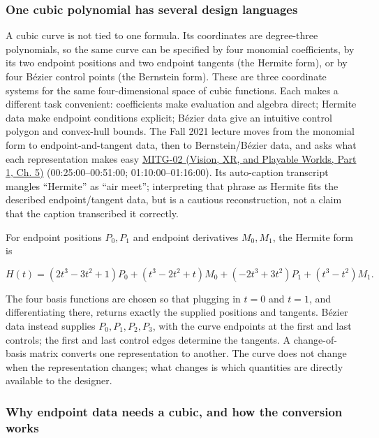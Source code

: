 \subsubsection{One cubic polynomial has several design languages}\label{03-visual-computing-i-ch001-one-cubic-polynomial-has-several-design-languages}

\hypertarget{03-visual-computing-i-ch001-one-cubic-polynomial-has-several-design-languages}{}

A cubic curve is not tied to one formula. Its coordinates are degree-three polynomials, so the same curve can be specified by four monomial coefficients, by its two endpoint positions and two endpoint tangents (the Hermite form), or by four Bézier control points (the Bernstein form). These are three coordinate systems for the same four-dimensional space of cubic functions. Each makes a different task convenient: coefficients make evaluation and algebra direct; Hermite data make endpoint conditions explicit; Bézier data give an intuitive control polygon and convex-hull bounds. The Fall 2021 lecture moves from the monomial form to endpoint-and-tangent data, then to Bernstein/Bézier data, and asks what each representation makes easy \href{../07-Vision-XR-and-Playable-Worlds-P01/main.pdf\#nameddest=04-visual-computing-ii-ch036-mitg-02---cubic-curves}{MITG-02 (Vision, XR, and Playable Worlds, Part 1, Ch. 5)} (00:25:00--00:51:00; 01:10:00--01:16:00). Its auto-caption transcript mangles ``Hermite'' as ``air meet''; interpreting that phrase as Hermite fits the described endpoint/tangent data, but is a cautious reconstruction, not a claim that the caption transcribed it correctly.

For endpoint positions \(P_0,P_1\) and endpoint derivatives \(M_0,M_1\), the Hermite form is

\[
H(t)=(2t^3-3t^2+1)P_0+(t^3-2t^2+t)M_0+(-2t^3+3t^2)P_1+(t^3-t^2)M_1.
\]

The four basis functions are chosen so that plugging in \(t=0\) and \(t=1\), and differentiating there, returns exactly the supplied positions and tangents. Bézier data instead supplies \(P_0,P_1,P_2,P_3\), with the curve endpoints at the first and last controls; the first and last control edges determine the tangents. A change-of-basis matrix converts one representation to another. The curve does not change when the representation changes; what changes is which quantities are directly available to the designer.

\subsubsection{Why endpoint data needs a cubic, and how the conversion works}\label{03-visual-computing-i-ch001-why-endpoint-data-needs-a-cubic-and-how-the-conversion-works}

